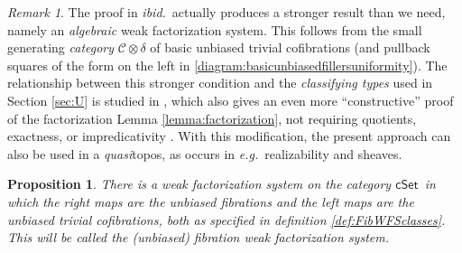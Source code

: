 \documentclass[11pt]{amsart}
\newcommand{\eg}{\emph{e.g.}}
\newcommand{\ibid}{\emph{ibid.}}
\newcommand{\cSet}{\ensuremath{\mathsf{cSet}}}
\newcommand{\I}{\ensuremath{\mathrm{I}}}
\newtheorem{proposition}[theorem]{Proposition}
\theoremstyle{remark}
\newtheorem{remark}[theorem]{Remark}
\theoremstyle{definition}
\begin{document}
%

\begin{remark}\label{remak:constructive}
The proof in \ibid\ actually produces a stronger result than we need, namely an \emph{algebraic} weak factorization system.  This follows from the small generating \emph{category} $\mathcal{C}\otimes\delta$  of basic unbiased trivial cofibrations (and pullback squares of the form on the left in \eqref{diagram:basicunbiasedfillersuniformity}).  The relationship between this stronger condition and the \emph{classifying types} used in Section \ref{sec:U} is studied in \cite{Swan}, which also gives an even more ``constructive'' proof of the factorization Lemma \ref{lemma:factorization}, not requiring quotients, exactness, or impredicativity \cite{Swan:Wtypes}.  With this modification, the present approach can also be used in a \emph{quasi}topos, as occurs in \eg\ realizability and sheaves.
\end{remark}


\begin{proposition}\label{prop:fibrationwfs}
There is a weak factorization system on the category \cSet\ in which the right maps are the unbiased fibrations and the left maps are the unbiased trivial cofibrations, both as specified in definition \ref{def:FibWFSclasses}.  This will be called the \emph{(unbiased) fibration weak factorization system}.
\end{proposition}
\end{document}
